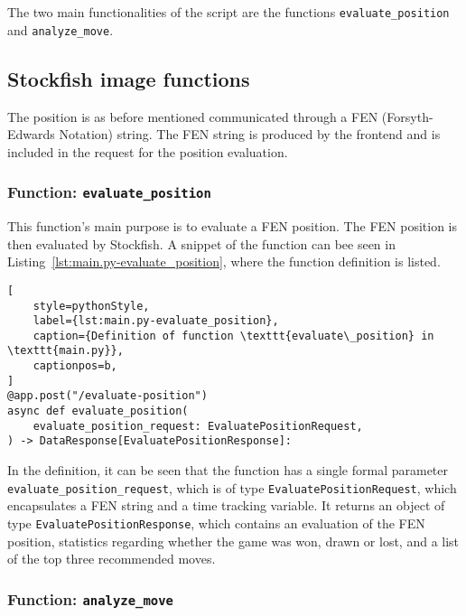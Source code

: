 The two main functionalities of the script are the functions \texttt{evaluate\_position} and \texttt{analyze\_move}.

\subsection{Stockfish image functions}\label{subsec:stockfish-image-functions}

The position is as before mentioned communicated through a FEN (Forsyth-Edwards Notation) string.
The FEN string is produced by the frontend and is included in the request for the position evaluation.


\subsubsection{Function: \texttt{evaluate\_position}}\label{subsubsec:function:evaluate_position}

This function's main purpose is to evaluate a FEN position.
The FEN position is then evaluated by Stockfish.
A snippet of the function can bee seen in Listing~\ref{lst:main.py-evaluate_position}, where the function definition is
listed.

\begin{lstlisting}[
    style=pythonStyle,
    label={lst:main.py-evaluate_position},
    caption={Definition of function \texttt{evaluate\_position} in \texttt{main.py}},
    captionpos=b,
]
@app.post("/evaluate-position")
async def evaluate_position(
    evaluate_position_request: EvaluatePositionRequest,
) -> DataResponse[EvaluatePositionResponse]:
\end{lstlisting}

In the definition, it can be seen that the function has a single formal parameter \texttt{evaluate\_position\_request},
which is of type \texttt{EvaluatePositionRequest}, which encapsulates a FEN string and a time tracking variable.
It returns an object of type \texttt{EvaluatePositionResponse}, which contains an evaluation of the FEN position,
statistics regarding whether the game was won, drawn or lost, and a list of the top three recommended moves.


\subsubsection{Function: \texttt{analyze\_move}}\label{subsubsec:function:analyze_move}

